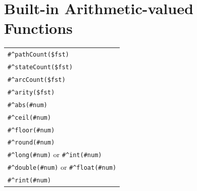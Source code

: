 \documentclass[letterpaper,12pt]{article}
\begin{document}
\section{Built-in Arithmetic-valued Functions}

\begin{tabular}{|l|}
\hline
\verb!#^pathCount($fst)! \\
\verb!#^stateCount($fst)! \\
\verb!#^arcCount($fst)! \\
\verb!#^arity($fst)! \\
\hline
\verb!#^abs(#num)! \\
\verb!#^ceil(#num)! \\
\verb!#^floor(#num)! \\
\verb!#^round(#num)! \\
\hline
\verb!#^long(#num)! or \verb!#^int(#num)! \\
\verb!#^double(#num)! or \verb!#^float(#num)! \\
\verb!#^rint(#num)! \\
\hline
\end{tabular}

\newpage


\end{document}
